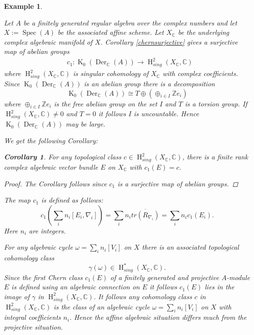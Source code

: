 \documentclass{amsart}
\theoremstyle{plain}
\newtheorem{corollary}[theorem]{Corollary}
\newtheorem{example}[theorem]{Example}
\theoremstyle{definition}
\theoremstyle{remark}
\numberwithin{equation}{theorem}
\begin{document}
\begin{example}\label{singularcohomology} 

Let $A$ be a finitely generated regular algebra over the complex numbers and let $X:={\operatorname{Spec} }(A)$ be the associated
affine scheme. Let $X_{\mathbb{C} }$ be the underlying complex algebraic manifold of $X$.
Corollary \ref{chernsurjective} gives a surjective map of abelian groups
\begin{align}
&\label{cplx}c_1:{\operatorname{K}}_0({\operatorname{Der} }_{\mathbb{C} }(A))\rightarrow {\operatorname{H} }^2_{sing}(X_{\mathbb{C} },{\mathbb{C} })
\end{align}
where ${\operatorname{H} }^2_{sing}(X_{\mathbb{C} },{\mathbb{C} })$ is singular cohomology of $X_{\mathbb{C} }$ with complex coefficients. 
Since ${\operatorname{K}}_0({\operatorname{Der} }_{\mathbb{C} }(A))$ is an abelian group there is a decomposition
\[ {\operatorname{K}}_0({\operatorname{Der} }_{\mathbb{C} }(A))\cong T\oplus (\oplus_{i\in I}\mathbb{Z}e_i) \]
where $\oplus_{i\in I}\mathbb{Z}e_i$ is the free abelian group on the set $I$ and $T$ is a torsion group. 
If ${\operatorname{H} }^2_{sing}(X_{\mathbb{C} },{\mathbb{C} })\neq 0$ and $T=0$ it follows $I$ is uncountable. Hence ${\operatorname{K}}_0({\operatorname{Der} }_{\mathbb{C} }(A))$ may be large.

We get the following Corollary:
\begin{corollary} For any topological
class $c\in {\operatorname{H} }^2_{sing}(X_{\mathbb{C} },{\mathbb{C} })$, there is a finite rank complex algebraic vector bundle $E$ on $X_{\mathbb{C} }$ with 
$c_1(E)=c$. 
\end{corollary}
\begin{proof} The Corollary follows since $c_1$ is a surjective map of abelian groups.
\end{proof}

The map $c_1$ is defined as follows: 
\[ c_1(\sum_i n_i[E_i, \nabla_i])=\sum_i n_i \overline{tr(R_{\nabla_i})}=\sum_i n_ic_1(E_i).\]
Here $n_i$ are integers. 

For any algebraic cycle $\omega=\sum_i n_i[V_i]$ on $X$ there is an associated topological cohomology class
\[ \gamma(\omega)\in {\operatorname{H} }^{*}_{sing}(X_{\mathbb{C} },{\mathbb{C} }).\]
Since the first Chern class $c_1(E)$ of a finitely generated and projective $A$-module $E$ is defined using 
an algebraic connection on $E$ it follows $c_1(E)$ lies in the image of $\gamma$ in ${\operatorname{H} }^2_{sing}(X_{\mathbb{C} },{\mathbb{C} })$. It follows
any cohomology class $c$ in ${\operatorname{H} }^2_{sing}(X_{\mathbb{C} },{\mathbb{C} })$ is the class of an algebraic cycle $\omega=\sum_i n_i[V_i]$ on $X$ 
with integral coefficients $n_i$. Hence the affine algebraic situation differs much from the projective situation.


\end{example}
\end{document}
